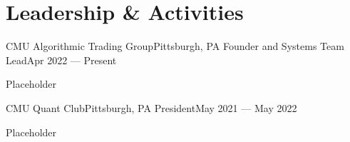 \section{Leadership \& Activities}
\resumeSectionStart

    \resumeSubheading
        {CMU Algorithmic Trading Group}{Pittsburgh, PA}
        {Founder and Systems Team Lead}{Apr 2022 --- Present}
    
    \resumeItemListStart
        \item Placeholder 
        \item 
    \resumeItemListEnd

    \resumeSubheading
        {CMU Quant Club}{Pittsburgh, PA}
        {President}{May 2021 --- May 2022}

    \resumeItemListStart
        \item Placeholder 
    \resumeItemListEnd

\resumeSectionEnd